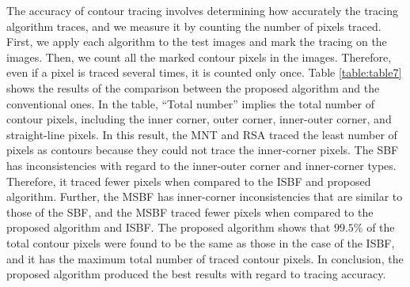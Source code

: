 


The accuracy of contour tracing involves determining how accurately the tracing algorithm traces, and we measure it by counting the number of pixels traced. First, we apply each algorithm to the test images and mark the tracing on the images. Then, we count all the marked contour pixels in the images. Therefore, even if a pixel is traced several times, it is counted only once. Table \ref{table:table7} shows the results of the comparison between the proposed algorithm and the conventional ones. In the table, ``Total number'' implies the total number of contour pixels, including the inner corner, outer corner, inner-outer corner, and straight-line pixels. In this result, the MNT and RSA traced the least number of pixels as contours because they could not trace the inner-corner pixels. The SBF has inconsistencies with regard to the inner-outer corner and inner-corner types. Therefore, it traced fewer pixels when compared to the ISBF and proposed algorithm. Further, the MSBF has inner-corner inconsistencies that are similar to those of the SBF, and the MSBF traced fewer pixels when compared to the proposed algorithm and ISBF. The proposed algorithm shows that $99.5\%$ of the total contour pixels were found to be the same as those in the case of the ISBF, and it has the maximum total number of traced contour pixels. In conclusion, the proposed algorithm produced the best results with regard to tracing accuracy.

